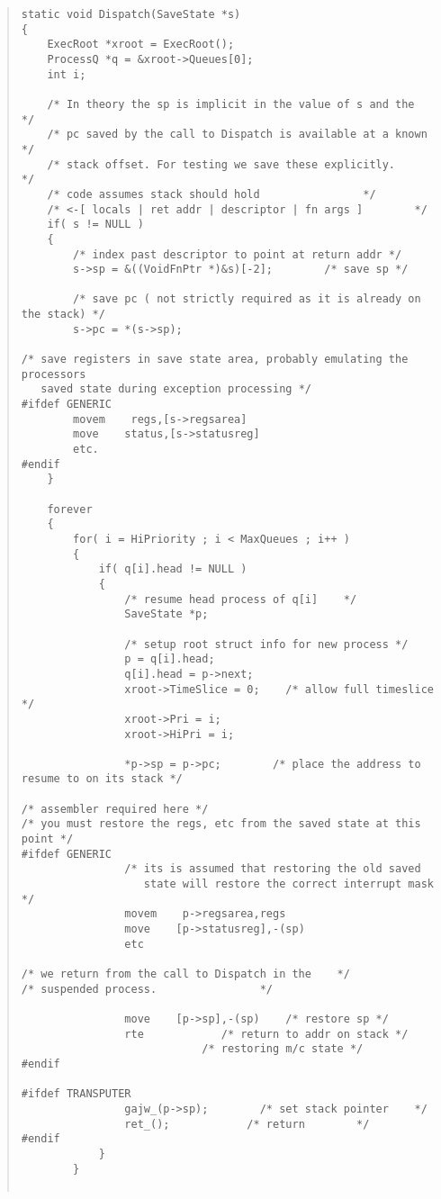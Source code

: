 \begin {quote}
\begin{verbatim}
static void Dispatch(SaveState *s)
{
    ExecRoot *xroot = ExecRoot();
    ProcessQ *q = &xroot->Queues[0];
    int i;
    
    /* In theory the sp is implicit in the value of s and the    */
    /* pc saved by the call to Dispatch is available at a known     */
    /* stack offset. For testing we save these explicitly.        */
    /* code assumes stack should hold                */
    /* <-[ locals | ret addr | descriptor | fn args ]        */
    if( s != NULL )
    {
        /* index past descriptor to point at return addr */
        s->sp = &((VoidFnPtr *)&s)[-2];        /* save sp */

        /* save pc ( not strictly required as it is already on the stack) */
        s->pc = *(s->sp);

/* save registers in save state area, probably emulating the processors
   saved state during exception processing */
#ifdef GENERIC
        movem    regs,[s->regsarea]
        move    status,[s->statusreg]
        etc.
#endif
    }

    forever
    {
        for( i = HiPriority ; i < MaxQueues ; i++ )
        {
            if( q[i].head != NULL )
            {
                /* resume head process of q[i]    */
                SaveState *p;
    
                /* setup root struct info for new process */
                p = q[i].head;
                q[i].head = p->next;
                xroot->TimeSlice = 0;    /* allow full timeslice */
                xroot->Pri = i;
                xroot->HiPri = i;

                *p->sp = p->pc;        /* place the address to resume to on its stack */

/* assembler required here */
/* you must restore the regs, etc from the saved state at this point */
#ifdef GENERIC
                /* its is assumed that restoring the old saved
                   state will restore the correct interrupt mask */
                movem    p->regsarea,regs
                move    [p->statusreg],-(sp)
                etc

/* we return from the call to Dispatch in the    */
/* suspended process.                */

                move    [p->sp],-(sp)    /* restore sp */
                rte            /* return to addr on stack */
                            /* restoring m/c state */
#endif

#ifdef TRANSPUTER
                gajw_(p->sp);        /* set stack pointer    */
                ret_();            /* return        */
#endif
            }
        }


\end{verbatim}
\end{quote}

